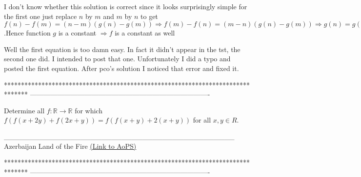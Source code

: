 \begin{solution}
	\begin{tcolorbox}I don't know whether this solution is correct since it looks surprisingly  simple for the first one just replace $n$ by $m$ and $m$ by $n$ to get $f(n)-f(m)=(n-m)(g(n)-g(m)) \Rightarrow f(m)-f(n)=(m-n)(g(n)-g(m)) \Rightarrow g(n)=g(m)$ .Hence function $g$ is a constant $\Rightarrow f$ is a constant as well\end{tcolorbox}
Well the first equation is too damn easy. In fact it didn't appear in the tst, the second one did. I intended to post that one. Unfortunately I did a typo and posted the first equation. After pco's solution I noticed that error and fixed it.
\end{solution}
*******************************************************************************
-------------------------------------------------------------------------------

\begin{problem}
	Determine all $f: \mathbb{R}\to\mathbb{R}$ for which $f(f(x+2y)+f(2x+y))=f(f(x+y)+2(x+y))$ for all $x,y{\in}R$.


_____________________________________________
Azerbaijan Land of the Fire 
	\flushright \href{https://artofproblemsolving.com/community/c6h528759}{(Link to AoPS)}
\end{problem}



*******************************************************************************
-------------------------------------------------------------------------------

